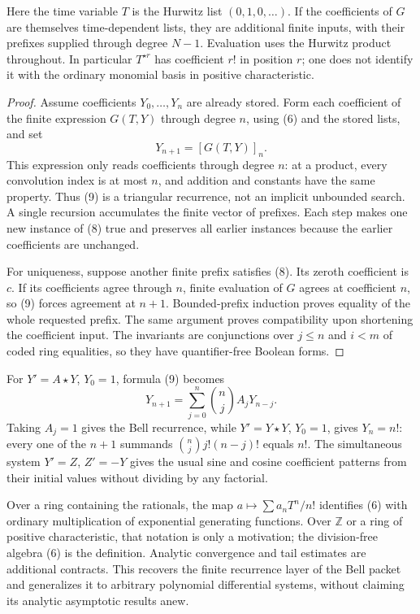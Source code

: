 Here the time variable $T$ is the Hurwitz list $(0,1,0,\ldots)$.
If the coefficients of $G$ are themselves time-dependent lists, they
are additional finite inputs, with their prefixes supplied through
degree $N-1$. Evaluation uses the Hurwitz product throughout. In
particular $T^{\star r}$ has coefficient $r!$ in position $r$;
one does not identify it with the ordinary monomial basis in positive
characteristic.

\begin{proof}
Assume coefficients $Y_0,\ldots,Y_n$ are already stored.  Form each
coefficient of the finite expression $G(T,Y)$ through degree $n$, using
(6) and the stored lists, and set
\[
 Y_{n+1}=[G(T,Y)]_n.                                           \tag{9}
\]
This expression only reads coefficients through degree $n$: at a product,
every convolution index is at most $n$, and addition and constants have
the same property.  Thus (9) is a triangular recurrence, not an implicit
unbounded search.  A single recursion accumulates the finite vector of
prefixes.  Each step makes one new instance of (8) true and preserves all
earlier instances because the earlier coefficients are unchanged.

For uniqueness, suppose another finite prefix satisfies (8).  Its zeroth
coefficient is $c$.  If its coefficients agree through $n$, finite
evaluation of $G$ agrees at coefficient $n$, so (9) forces agreement at
$n+1$.  Bounded-prefix induction proves equality of the whole requested
prefix.  The same argument proves compatibility upon shortening the
coefficient input.  The invariants are conjunctions over $j\le n$ and
$i<m$ of coded ring equalities, so they have quantifier-free Boolean forms.
\end{proof}

For $Y'=A\star Y$, $Y_0=1$, formula (9) becomes
\[
 Y_{n+1}=\sum_{j=0}^n\binom nj A_jY_{n-j}.                      \tag{10}
\]
Taking $A_j=1$ gives the Bell recurrence, while $Y'=Y\star Y$, $Y_0=1$,
gives $Y_n=n!$: every one of the $n+1$ summands
$\binom nj j!(n-j)!$ equals $n!$.
The simultaneous system $Y'=Z$, $Z'=-Y$ gives the usual sine and cosine
coefficient patterns from their initial values without dividing by any
factorial.

Over a ring containing the rationals, the map
$a\mapsto\sum a_n T^n/n!$ identifies (6) with ordinary multiplication
of exponential generating functions.  Over $\mathbb Z$ or a ring of
positive characteristic, that notation is only a motivation; the
division-free algebra (6) is the definition.  Analytic convergence and
tail estimates are additional contracts.  This recovers the finite
recurrence layer of the Bell packet and generalizes it to arbitrary
polynomial differential systems, without claiming its analytic asymptotic
results anew.

